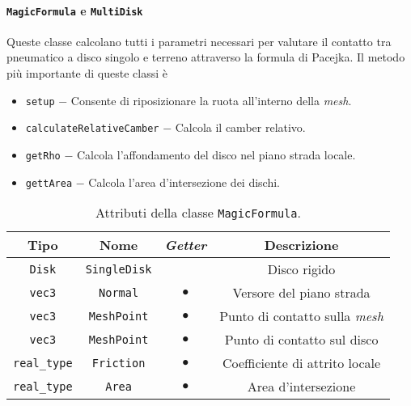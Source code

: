 \paragraph{\texttt{MagicFormula} e \texttt{MultiDisk}}
Queste classe calcolano tutti i parametri necessari per valutare il contatto tra pneumatico a disco singolo e terreno attraverso la formula di Pacejka. Il metodo più importante di queste classi è
\begin{itemize}
	\item \texttt{setup} $-$ Consente di riposizionare la ruota all'interno della \textit{mesh}.
	\item \texttt{calculateRelativeCamber} $-$ Calcola il camber relativo.
	\item \texttt{getRho} $-$ Calcola l'affondamento del disco nel piano strada locale.
	\item \texttt{gettArea} $-$ Calcola l'area d'intersezione dei dischi.
\end{itemize}
\begin{table}[h!]
	\centering
	\begin{tabular}{|c|c|c|c|}
		\hline 
		\textbf{Tipo} & \textbf{Nome} & \textit{\textbf{Getter}} & \textbf{Descrizione} \\ \hline 
		\texttt{Disk} & \texttt{SingleDisk} &  & Disco rigido \\ \hline 
		\texttt{vec3} & \texttt{Normal} & $\bullet$ & Versore del piano strada \\ \hline
		\texttt{vec3} & \texttt{MeshPoint} & $\bullet$ & Punto di contatto sulla \textit{mesh} \\ \hline
		\texttt{vec3} & \texttt{MeshPoint} & $\bullet$ & Punto di contatto sul disco \\ \hline
		\texttt{real\_type} & \texttt{Friction} & $\bullet$ & Coefficiente di attrito locale \\ \hline
		\texttt{real\_type} & \texttt{Area} & $\bullet$ & Area d'intersezione \\ \hline
	\end{tabular}
	\caption{Attributi della classe \texttt{MagicFormula}.}
	\label{}
\end{table}
%
